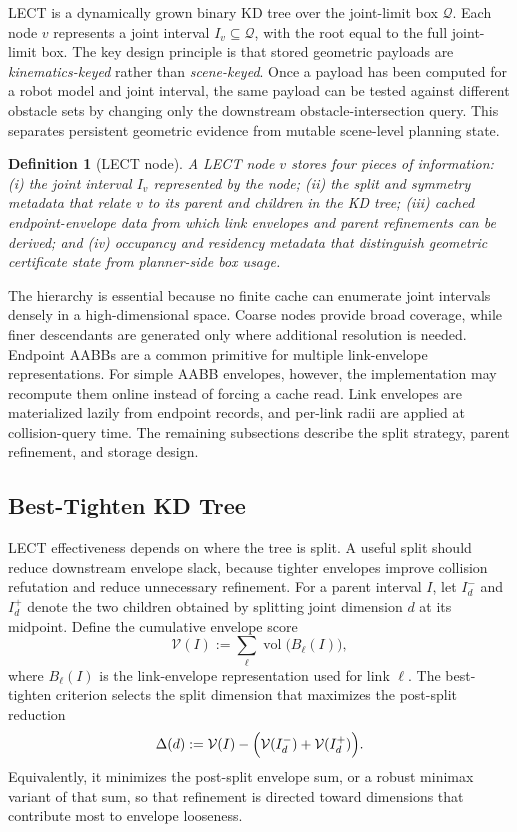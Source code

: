 \documentclass[journal]{IEEEtran}
\newtheorem{definition}{Definition}
\newcommand{\Q}{\ensuremath{\mathcal{Q}}}
\begin{document}
LECT is a dynamically grown binary KD tree over the joint-limit box $\Q$. Each
node $v$ represents a joint interval $I_v \subseteq \Q$, with the root equal to
the full joint-limit box. The key design principle is that stored geometric
payloads are \emph{kinematics-keyed} rather than \emph{scene-keyed}. Once a
payload has been computed for a robot model and joint interval, the same
payload can be tested against different obstacle sets by changing only the
downstream obstacle-intersection query. This separates persistent geometric
evidence from mutable scene-level planning state.

\begin{definition}[LECT node]
A LECT node $v$ stores four pieces of information: (i) the joint interval
$I_v$ represented by the node; (ii) the split and symmetry metadata that relate
$v$ to its parent and children in the KD tree; (iii) cached endpoint-envelope
data from which link envelopes and parent refinements can be derived; and
(iv) occupancy and residency metadata that distinguish geometric certificate
state from planner-side box usage.
\end{definition}

The hierarchy is essential because no finite cache can enumerate joint
intervals densely in a high-dimensional space. Coarse nodes provide broad
coverage, while finer descendants are generated only where additional
resolution is needed. Endpoint AABBs are a common primitive for multiple
link-envelope representations. For simple AABB envelopes, however, the
implementation may recompute them online instead of forcing a cache read. Link
envelopes are materialized lazily from endpoint records, and per-link radii are
applied at collision-query time. The remaining subsections describe the split
strategy, parent refinement, and storage design.

\subsection{Best-Tighten KD Tree}
\label{sec:lect_split}

LECT effectiveness depends on where the tree is split. A useful split should
reduce downstream envelope slack, because tighter envelopes improve collision
refutation and reduce unnecessary refinement. For a parent interval $I$, let
$I_d^{-}$ and $I_d^{+}$ denote the two children obtained by splitting joint
dimension $d$ at its midpoint. Define the cumulative envelope score
\[
\mathcal{V}(I) := \sum_{\ell} \operatorname{vol}\bigl(B_\ell(I)\bigr),
\]
where $B_\ell(I)$ is the link-envelope representation used for link $\ell$.
The best-tighten criterion selects the split dimension that maximizes the
post-split reduction
\[
\Delta(d) := \mathcal{V}(I)
- \Bigl(\mathcal{V}(I_d^{-}) + \mathcal{V}(I_d^{+})\Bigr).
\]
Equivalently, it minimizes the post-split envelope sum, or a robust minimax
variant of that sum, so that refinement is directed toward dimensions that
contribute most to envelope looseness.
\end{document}
